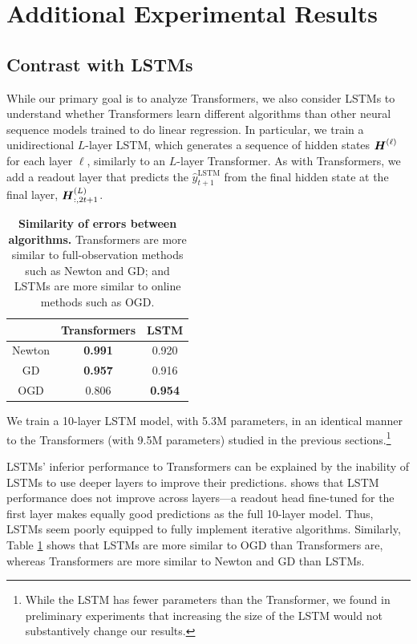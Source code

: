 \section{Additional Experimental Results} \label{app:add_exp}

\subsection{Contrast with LSTMs} \label{app:lstm}

While our primary goal is to analyze Transformers, we also consider LSTMs \citep{hochreiter1997lstm} to understand whether Transformers learn different algorithms than other neural sequence models trained to do linear regression. In particular, we train a unidirectional $L$-layer LSTM, which generates a sequence of hidden states $\boldsymbol{H}^{(\ell)}$ for each layer $\ell$, similarly to an $L$-layer Transformer.
As with Transformers, we add a readout layer that predicts the $\hat{y}_{t+1}^{\mathrm{LSTM}}$ from the final hidden state at the final layer, $\boldsymbol{H}_{:,2t+1}^{(L)}$.


\begin{table}[!htp]
    \centering
    \begin{tabular}{c|c|c}
        & Transformers &  LSTM \\
         \midrule
     Newton & \textbf{0.991} & 0.920  \\
     GD & \textbf{0.957} & 0.916 \\
     OGD   & 0.806 & \textbf{0.954}  
    \end{tabular}
    \caption{\textbf{Similarity of errors between algorithms.} Transformers are more similar to full-observation methods such as Newton and GD; and LSTMs are more similar to online methods such as OGD.}
    \vspace{-1ex}
    \label{tab:lstm}
\end{table}

We train a 10-layer LSTM model, with 5.3M parameters, in an identical manner to the Transformers (with 9.5M parameters) studied in the previous sections.\footnote{While the LSTM has fewer parameters than the Transformer, we found in preliminary experiments that increasing the size of the LSTM would not substantively change our results.}

LSTMs' inferior performance to Transformers can be explained by the inability of LSTMs to use deeper layers to improve their predictions.
 shows that LSTM performance does not improve across layers---a readout head fine-tuned for the first layer makes equally good predictions as the full 10-layer model. 
Thus, LSTMs seem poorly equipped to fully implement iterative algorithms.
Similarly, Table \ref{tab:lstm} shows that LSTMs are more similar to OGD than Transformers are, whereas Transformers are more similar to Newton and GD than LSTMs.


